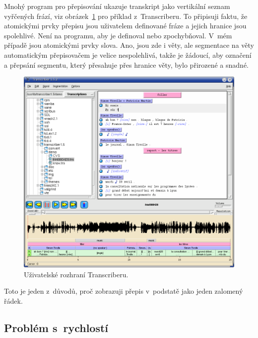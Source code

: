 Mnohý program pro přepisování ukazuje transkript jako vertikální seznam
vyřčených frází,
viz obrázek~\ref{fig:transcriber} pro příklad z~Transcriberu. To připisuji faktu,
že atomickými prvky přepisu jsou uživatelem definované fráze a jejich hranice
jsou spolehlivé. Není na programu, aby je definoval nebo
zpochybňoval. V~mém případě jsou atomickými prvky slova. Ano, jsou zde i věty,
ale segmentace na věty automatickým přepisovačem je velice nespolehlivá, takže
je žádoucí, aby označení a přepsání segmentu, který přesahuje přes hranice věty,
bylo přirozené a snadné.

\begin{figure}[htpb]
\includegraphics[scale=0.45]{rc/transcriber1.png}
\caption{Uživatelské rozhraní Transcriberu.}
\label{fig:transcriber}
\end{figure}

Toto je jeden z~důvodů, proč zobrazuji přepis v~podstatě jako jeden zalomený
řádek.

\subsection{Problém s~rychlostí}

